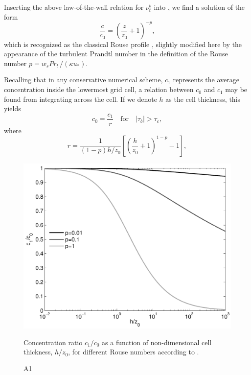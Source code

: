 Inserting the above law-of-the-wall relation for $\nu_t^b$ into
, we find a solution of the form
\begin{equation}
 \label{Rouse}
 \dfrac{c}{c_0} = \left( \frac{z}{z_0} + 1 \right)^{-p} \comma
\end{equation}
which is recognized as the classical Rouse profile
\citep{vanRijn84b}, slightly modified here by the appearance of the
turbulent Prandtl number in the definition of the Rouse number $p =
w_sPr_t \, / (\kappa u_\ast)$.

Recalling that in any conservative numerical scheme, $c_1$ represents
the average concentration inside the lowermost grid cell, a relation
between $c_0$ and $c_1$ may be found from integrating 
across the cell. If we denote $h$ as the cell thickness, this yields
\begin{equation}
 \label{cbot}
 c_0 = \frac{c_1}{r} \quad \text{for} \quad |\tau_b|>\tau_c \comma
\end{equation}
where 
\begin{equation}
 \label{rr}
 r =  \frac{1}{(1-p) h/z_0} \left[ \left( \frac{h}{z_0} + 1 \right)^{1-p} -1 \right] 
 \comma
\end{equation}
\begin{figure}[ht]
  \noindent\includegraphics[width=29pc,angle=0]{bilder/rouse.pdf}\\
  \caption{A1}{Concentration ratio $c_1/c_0$ as a function of
    non-dimensional cell thickness, $h/z_0$, for different Rouse
    numbers according to .\label{c0c1}}
\end{figure}
